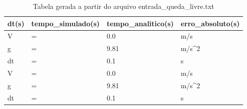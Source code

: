 \begin{table}
\caption{Tabela gerada a partir do arquivo entrada_queda_livre.txt}
\label{tab:entrada_queda_livre}
\begin{tabular}{llll}
\toprule
dt(s) & tempo_simulado(s) & tempo_analitico(s) & erro_absoluto(s) \\
\midrule
V & = & 0.0 & m/s \\
g & = & 9.81 & m/s^2 \\
dt & = & 0.1 & s \\
V & = & 0.0 & m/s \\
g & = & 9.81 & m/s^2 \\
dt & = & 0.1 & s \\
\bottomrule
\end{tabular}
\end{table}
